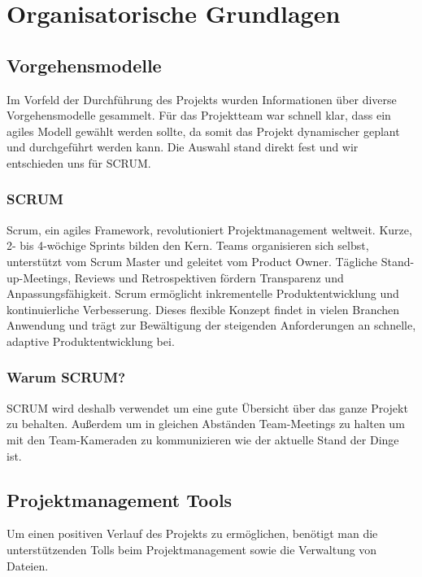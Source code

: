\usepackage{marginnote}
\chapter{Organisatorische Grundlagen}

\section{Vorgehensmodelle}
Im Vorfeld der Durchführung des Projekts wurden Informationen über diverse Vorgehensmodelle
gesammelt. Für das Projektteam war schnell klar, dass ein agiles Modell gewählt werden sollte,
da somit das Projekt dynamischer geplant und durchgeführt werden kann. Die Auswahl stand direkt
fest und wir entschieden uns für SCRUM.

\subsection{SCRUM}
Scrum, ein agiles Framework, revolutioniert Projektmanagement weltweit.
Kurze, 2- bis 4-wöchige Sprints bilden den Kern. Teams organisieren sich selbst,
unterstützt vom Scrum Master und geleitet vom Product Owner. Tägliche Stand-up-Meetings,
Reviews und Retrospektiven fördern Transparenz und Anpassungsfähigkeit. Scrum ermöglicht
inkrementelle Produktentwicklung und kontinuierliche Verbesserung. Dieses flexible
Konzept findet in vielen Branchen Anwendung und trägt zur Bewältigung der steigenden
Anforderungen an schnelle, adaptive Produktentwicklung bei.

\subsection{Warum SCRUM?}
SCRUM wird deshalb verwendet um eine gute Übersicht über das ganze Projekt zu behalten.
Außerdem um in gleichen Abständen Team-Meetings zu halten um mit den Team-Kameraden zu
kommunizieren wie der aktuelle Stand der Dinge ist.

\section{Projektmanagement Tools}
Um einen positiven Verlauf des Projekts zu ermöglichen, benötigt man die unterstützenden
Tolls beim Projektmanagement sowie die Verwaltung von Dateien.

